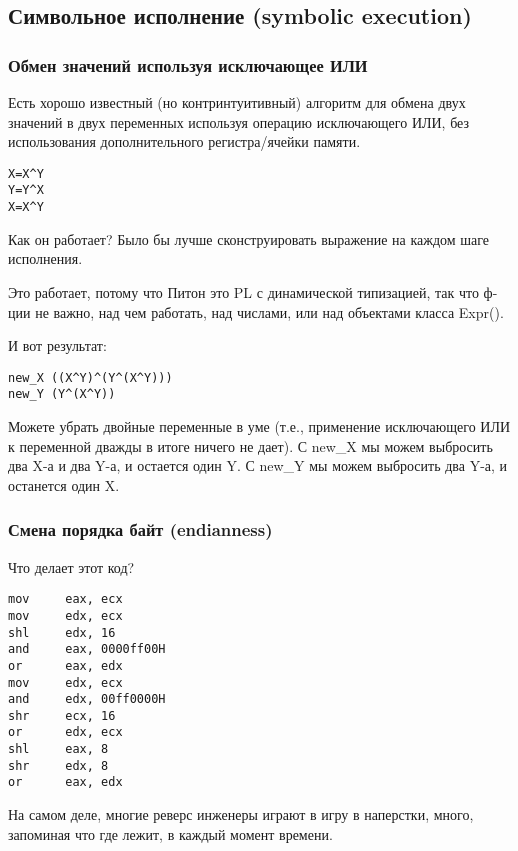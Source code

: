 \subsection{Символьное исполнение (symbolic execution)}
\label{symbolic_exec}

\subsubsection{Обмен значений используя исключающее ИЛИ}

Есть хорошо известный (но контринтуитивный) алгоритм для обмена двух значений в двух переменных используя операцию
исключающего ИЛИ, без использования дополнительного регистра/ячейки памяти.

\begin{lstlisting}
X=X^Y
Y=Y^X
X=X^Y
\end{lstlisting}

Как он работает?
Было бы лучше сконструировать выражение на каждом шаге исполнения.



Это работает, потому что Питон это \ac{PL} с динамической типизацией, так что ф-ции не важно, над чем работать,
над числами, или над объектами класса Expr().

И вот результат:

\begin{lstlisting}
new_X ((X^Y)^(Y^(X^Y)))
new_Y (Y^(X^Y))
\end{lstlisting}

Можете убрать двойные переменные в уме (т.е., применение исключающего ИЛИ к переменной дважды в итоге ничего не дает).
С new\_X мы можем выбросить два X-а и два Y-а, и остается один Y.
С new\_Y мы можем выбросить два Y-а, и останется один X.

\subsubsection{Смена порядка байт (endianness)}

Что делает этот код?

\begin{lstlisting}
mov     eax, ecx
mov     edx, ecx
shl     edx, 16
and     eax, 0000ff00H
or      eax, edx
mov     edx, ecx
and     edx, 00ff0000H
shr     ecx, 16
or      edx, ecx
shl     eax, 8
shr     edx, 8
or      eax, edx
\end{lstlisting}

На самом деле, многие реверс инженеры играют в игру в наперстки, много, запоминая что где лежит, в каждый момент времени.

